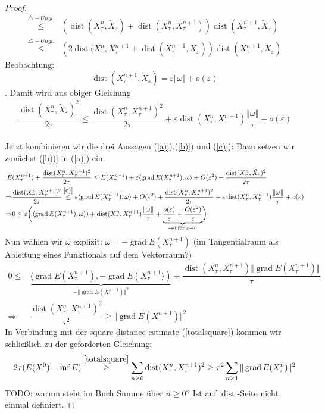 \documentclass[11pt,a4paper,notitlepage]{scrreprt}
\newcommand{\dist}{\operatorname{dist}}
\newcommand{\grad}{\operatorname{grad}}
\begin{document}
\begin{proof}
\begin{align*}
\overset{\triangle-Ungl.}\leq& \left(\dist(X_\tau^n,\tilde{X}_\varepsilon)+\dist(X_\tau^n,X_\tau^{n+1})\right)\dist(X_\tau^{n+1},\tilde{X}_\varepsilon) \\
\overset{\triangle-Ungl.}\leq&\left(2\dist(X_\tau^n,X_\tau^{n+1}+\dist(X_\tau^{n+1},\tilde{X}_\varepsilon)\right)\dist(X_\tau^{n+1},\tilde{X}_\varepsilon)
\end{align*}
Beobachtung: \[\dist(X_\tau^{n+1},\tilde{X}_\varepsilon)=\varepsilon\Vert \omega \Vert + o(\varepsilon) \].
Damit wird aus obiger Gleichung
\begin{eqnarray}
\dfrac{\dist(X_\tau^n,\tilde{X}_\varepsilon)^2}{2\tau}\leq \dfrac{\dist(X_\tau^n,X_\tau^{n+1})^2}{2\tau}+\varepsilon\dist(X_\tau^n,X_\tau^{n+1})\dfrac{\Vert \omega \Vert}{\tau} + o(\varepsilon) \label{c)}
\end{eqnarray}
\\
Jetzt kombinieren wir die drei Aussagen (\ref{a)}),(\ref{b)}) und (\ref{c)}): Dazu setzen wir zunächst (\ref{b))} in (\ref{a)}) ein.
\begin{align*}
E&(X_\tau^{n+1})+\dfrac{\dist(X_\tau^n,X_\tau^{n+1})^2}{2\tau}\leq E(X_\tau^{n+1})+\varepsilon\langle \grad E(X_\tau^{n+1}),\omega\rangle+O(\varepsilon^2)+\dfrac{\dist(X_\tau^n,\tilde{X}_\varepsilon)^2}{2\tau}
\\
\Rightarrow& \dfrac{\dist(X_\tau^n,X_\tau^{n+1})^2}{2\tau}\overset{\ref{c)}}{\leq} \varepsilon\langle \grad E(X_\tau^{n+1}),\omega\rangle+O(\varepsilon^2)+ \dfrac{\dist(X_\tau^n,X_\tau^{n+1})^2}{2\tau}+\varepsilon\dist(X_\tau^n,X_\tau^{n+1})\dfrac{\Vert \omega \Vert}{\tau} + o(\varepsilon)\\
\Rightarrow& 0\leq \varepsilon \bigg(\langle \grad E(X_\tau^{n+1}),\omega\rangle)+\dist(X_\tau^n,X_\tau^{n+1})\dfrac{\Vert \omega \Vert}{\tau} +\underset{\to 0 \text{ für } \varepsilon \to 0} {\underbrace{\dfrac{o(\varepsilon)}{\varepsilon}+\dfrac{O(\varepsilon^2)}{\varepsilon}}} \bigg)
\end{align*}
Nun wählen wir $\omega$ explizit: $\omega=-\grad E(X_\tau^{n+1})$ (im Tangentialraum als Ableitung eines Funktionals auf dem Vektorraum?)
\begin{align*}
0\leq& \underset{-\Vert \grad E(X_\tau^{n+1}) \Vert^2}{\underbrace{\langle \grad E(X_\tau^{n+1}),-\grad E(X_\tau^{n+1}\rangle)}}+\dfrac{\dist(X_\tau^n,X_\tau^{n+1})\Vert \grad E(X_\tau^{n+1}) \Vert}{\tau}\\
\Rightarrow& \dfrac{\dist(X_\tau^n,X_\tau^{n+1})^2}{\tau^2} \geq \Vert \grad E(X_\tau^{n+1}) \Vert^2
\end{align*}
In Verbindung mit der square distance estimate (\ref{totalsquare}) kommen wir schließlich zu der geforderten Gleichung:
\begin{equation}
 2\tau (E(X^0)-\inf E)\overset{\ref{totalsquare}}\geq \sum_{n\geq 0} \dist(X_\tau^n,X_\tau^{n+1})^2 \geq \tau^2 \sum_{n\geq 1} \Vert \grad E(X_\tau^n)\Vert^2
\end{equation}
TODO: warum steht im Buch Summe über $n\geq 0$? Ist auf $\dist$-Seite nicht einmal definiert.
\end{proof}
\end{document}
